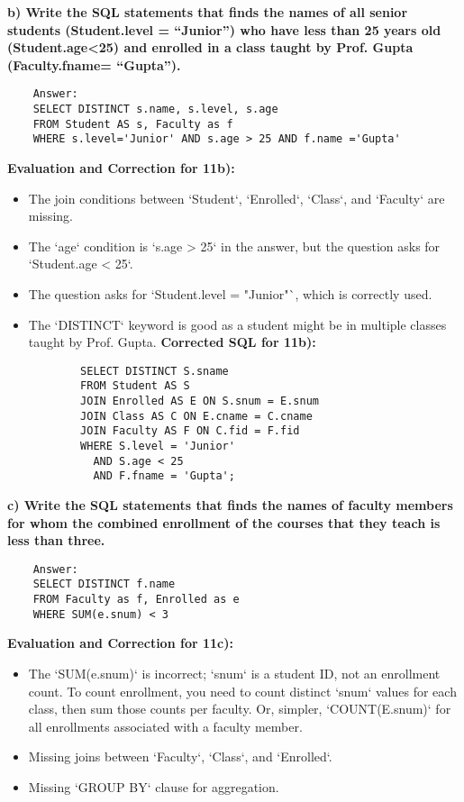 \documentclass{article}
\begin{document}
\begin{enumerate}[label=\textbf{Question \arabic*.}]
    \textbf{b) Write the SQL statements that finds the names of all senior students (Student.level = “Junior”) who have less than 25 years old (Student.age<25) and enrolled in a class taught by Prof. Gupta (Faculty.fname= “Gupta”).}
    \begin{lstlisting}
    Answer:
    SELECT DISTINCT s.name, s.level, s.age
    FROM Student AS s, Faculty as f
    WHERE s.level='Junior' AND s.age > 25 AND f.name ='Gupta'
    \end{lstlisting}
    \textbf{Evaluation and Correction for 11b):}
    \begin{itemize}
        \item The join conditions between `Student`, `Enrolled`, `Class`, and `Faculty` are missing.
        \item The `age` condition is `s.age > 25` in the answer, but the question asks for `Student.age < 25`.
        \item The question asks for `Student.level = "Junior"`, which is correctly used.
        \item The `DISTINCT` keyword is good as a student might be in multiple classes taught by Prof. Gupta.
        \textbf{Corrected SQL for 11b):}
        \begin{lstlisting}
        SELECT DISTINCT S.sname
        FROM Student AS S
        JOIN Enrolled AS E ON S.snum = E.snum
        JOIN Class AS C ON E.cname = C.cname
        JOIN Faculty AS F ON C.fid = F.fid
        WHERE S.level = 'Junior'
          AND S.age < 25
          AND F.fname = 'Gupta';
        \end{lstlisting}
    \end{itemize}

    \textbf{c) Write the SQL statements that finds the names of faculty members for whom the combined enrollment of the courses that they teach is less than three.}
    \begin{lstlisting}
    Answer:
    SELECT DISTINCT f.name
    FROM Faculty as f, Enrolled as e
    WHERE SUM(e.snum) < 3
    \end{lstlisting}
    \textbf{Evaluation and Correction for 11c):}
    \begin{itemize}
        \item The `SUM(e.snum)` is incorrect; `snum` is a student ID, not an enrollment count. To count enrollment, you need to count distinct `snum` values for each class, then sum those counts per faculty. Or, simpler, `COUNT(E.snum)` for all enrollments associated with a faculty member.
        \item Missing joins between `Faculty`, `Class`, and `Enrolled`.
        \item Missing `GROUP BY` clause for aggregation.


\end{itemize}
\end{enumerate}
\end{document}
